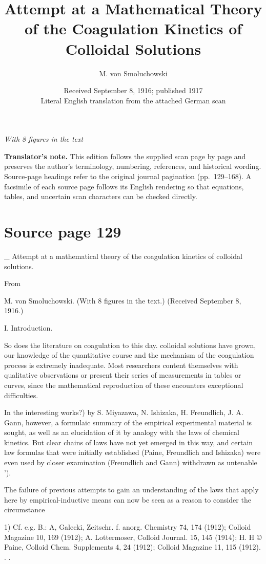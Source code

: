 \documentclass[11pt]{article}
\title{Attempt at a Mathematical Theory of the Coagulation Kinetics of Colloidal Solutions}
\author{M. von Smoluchowski}
\date{Received September 8, 1916; published 1917\\[1ex]\small Literal English translation from the attached German scan}
\begin{document}
\maketitle
\begin{center}
\emph{With 8 figures in the text}
\end{center}
\noindent\textbf{Translator's note.} This edition follows the supplied scan page by page and preserves the author's terminology, numbering, references, and historical wording. Source-page headings refer to the original journal pagination (pp.~129--168). A facsimile of each source page follows its English rendering so that equations, tables, and uncertain scan characters can be checked directly.
\tableofcontents
\clearpage

\section*{Source page 129}
\_ Attempt at a mathematical theory of the coagulation kinetics of colloidal solutions.

From

M. von Smoluchowski. (With 8 figures in the text.) (Received September 8, 1916.)

I. Introduction.

So does the literature on coagulation to this day. colloidal solutions have grown, our knowledge of the quantitative course and the mechanism of the coagulation process is extremely inadequate. Most researchers content themselves with qualitative observations or present their series of measurements in tables or curves, since the mathematical reproduction of these encounters exceptional difficulties.

In the interesting works?) by S. Miyazawa, N. Ishizaka, H. Freundlich, J. A. Gann, however, a formulaic summary of the empirical experimental material is sought, as well as an elucidation of it by analogy with the laws of chemical kinetics. But clear chains of laws have not yet emerged in this way, and certain law formulas that were initially established (Paine, Freundlich and Ishizaka) were even used by closer examination (Freundlich and Gann) withdrawn as untenable ').

The failure of previous attempts to gain an understanding of the laws that apply here by empirical-inductive means can now be seen as a reason to consider the circumstance

1) Cf. e.g. B.: A, Galecki, Zeitschr. f. anorg. Chemistry 74, 174 (1912); Colloid Magazine 10, 169 (1912); A. Lottermoser, Colloid Journal. 15, 145 (1914); H. H © Paine, Colloid Chem. Supplements 4, 24 (1912); Colloid Magazine 11, 115 (1912). . .
\end{document}
